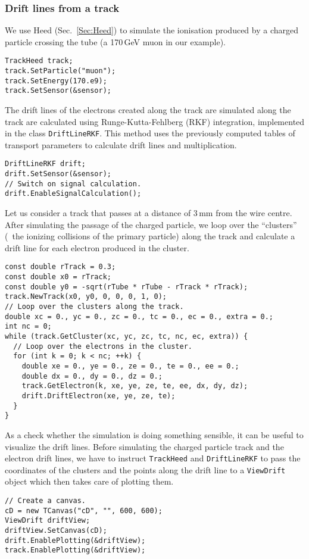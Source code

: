 \subsubsection{Drift lines from a track}
We use Heed (Sec.~\ref{Sec:Heed}) to simulate the ionisation 
produced by a charged particle crossing the tube 
(a 170\,GeV muon in our example).
\begin{lstlisting}
TrackHeed track;
track.SetParticle("muon");
track.SetEnergy(170.e9);
track.SetSensor(&sensor);
\end{lstlisting}
The drift lines of the electrons created along the track are simulated 
along the track are calculated using Runge-Kutta-Fehlberg (RKF) integration,
implemented in the class \texttt{DriftLineRKF}.
This method uses the previously computed tables of transport parameters to 
calculate drift lines and multiplication. 
\begin{lstlisting}
DriftLineRKF drift;
drift.SetSensor(&sensor);
// Switch on signal calculation.
drift.EnableSignalCalculation();
\end{lstlisting}
Let us consider a track that passes at a distance of 3\,mm
from the wire centre. After simulating the passage of the charged particle,
we loop over the ``clusters'' 
(\ie~the ionizing collisions of the primary particle)
along the track and calculate a drift line for each electron produced in 
the cluster.
\begin{lstlisting}
const double rTrack = 0.3;
const double x0 = rTrack;
const double y0 = -sqrt(rTube * rTube - rTrack * rTrack);
track.NewTrack(x0, y0, 0, 0, 0, 1, 0);
// Loop over the clusters along the track.
double xc = 0., yc = 0., zc = 0., tc = 0., ec = 0., extra = 0.;
int nc = 0;
while (track.GetCluster(xc, yc, zc, tc, nc, ec, extra)) {
  // Loop over the electrons in the cluster.
  for (int k = 0; k < nc; ++k) {
    double xe = 0., ye = 0., ze = 0., te = 0., ee = 0.;
    double dx = 0., dy = 0., dz = 0.;
    track.GetElectron(k, xe, ye, ze, te, ee, dx, dy, dz);
    drift.DriftElectron(xe, ye, ze, te);
  }
}
\end{lstlisting}
As a check whether the simulation is doing something sensible, 
it can be useful to visualize the drift lines. 
Before simulating the charged particle track and
the electron drift lines, we have to instruct \texttt{TrackHeed} and
\texttt{DriftLineRKF} to pass the coordinates of the clusters and the 
points along the drift line to a \texttt{ViewDrift} object
which then takes care of plotting them.
\begin{lstlisting}
// Create a canvas.
cD = new TCanvas("cD", "", 600, 600);
ViewDrift driftView;
driftView.SetCanvas(cD);
drift.EnablePlotting(&driftView);
track.EnablePlotting(&driftView);
\end{lstlisting}
